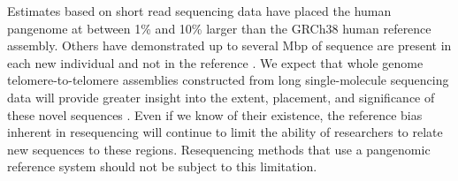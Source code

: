 Estimates based on short read sequencing data have placed the human pangenome at between 1\% \cite{li2010building} and 10\% \cite{sherman2019assembly} larger than the GRCh38 human reference assembly.
Others have demonstrated up to several Mbp of sequence are present in each new individual and not in the reference \cite{Hehir-Kwa2016-hb,Audano_2019}.
We expect that whole genome telomere-to-telomere assemblies constructed from long single-molecule sequencing data will provide greater insight into the extent, placement, and significance of these novel sequences \cite{miga2019telomere,Langley_2019}.
Even if we know of their existence, the reference bias inherent in resequencing will continue to limit the ability of researchers to relate new sequences to these regions.
Resequencing methods that use a pangenomic reference system should not be subject to this limitation.





